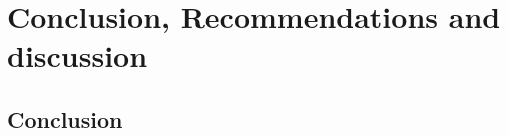 \documentclass[12pt]{scrreprt}
\begin{document}
%


%

%

\chapter{Conclusion, Recommendations and discussion}
\section{Conclusion}
\end{document}
